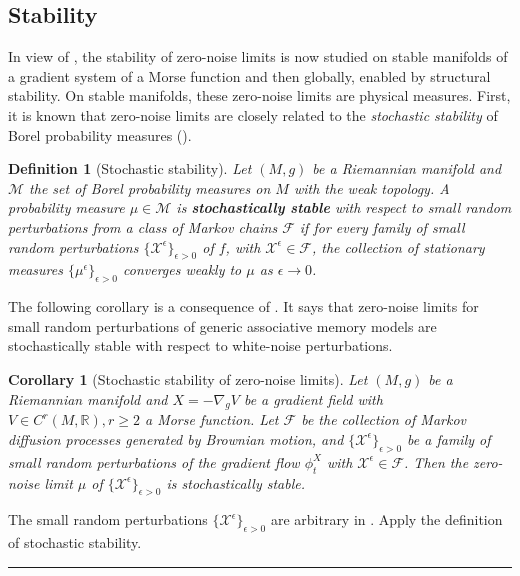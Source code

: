 \documentclass[12pt]{article}
\newcommand{\BlackBox}{\rule{1.5ex}{1.5ex}}  %
\renewenvironment{proof}{\par\noindent{\bf Proof\ }}{\hfill\BlackBox\\[2mm]}
\newenvironment{proof}{\par\noindent{\bf Proof\ }}{\hfill\BlackBox\\[2mm]}
\newtheorem{corollary}[theorem]{Corollary}
\newtheorem{definition}[theorem]{Definition}
\begin{document}
\subsection{Stability}
\label{subsection:robustness-diffusion-models}
In view of , the stability of zero-noise limits is now studied on stable manifolds of a gradient system of a Morse function and then globally, enabled by structural stability. On stable manifolds, these zero-noise limits are physical measures. First, it is known that zero-noise limits are closely related to the \textit{stochastic stability} of Borel probability measures (\cite{cowieson2005srb}). 

\begin{definition}[Stochastic stability]
\label{definition:stochastic-stability}
    Let $(M,g)$ be a Riemannian manifold and $\mathcal{M}$ the set of Borel probability measures on $M$ with the weak topology. A probability measure $\mu \in \mathcal{M}$ is \textbf{\textit{stochastically stable}} with respect to small random perturbations from a class of Markov chains $\mathcal{F}$ if for every family of small random perturbations $\{\mathcal{X}^{\epsilon}\}_{\epsilon>0}$ of $f$, with $\mathcal{X}^{\epsilon} \in \mathcal{F}$, the collection of stationary measures $\{\mu^{\epsilon}\}_{\epsilon>0}$ converges weakly to $\mu$ as $\epsilon \rightarrow 0$.
\end{definition}

The following corollary is a consequence of . It says that zero-noise limits for small random perturbations of generic associative memory models are stochastically stable with respect to white-noise perturbations.
\begin{corollary}[Stochastic stability of zero-noise limits]
\label{corollary:stochastically-stable}
    Let $(M,g)$ be a Riemannian manifold and $X=-\nabla_g V$ be a gradient field with $V \in C^r(M, \mathbb{R}), r\geq 2$ a Morse function. Let $\mathcal{F}$ be the collection of Markov diffusion processes generated by Brownian motion, and $\{\mathcal{X}^{\epsilon}\}_{\epsilon>0}$ be a family of small random perturbations of the gradient flow $\phi_t^X$ with $\mathcal{X}^{\epsilon}\in \mathcal{F}$. Then the zero-noise limit $\mu$ of $\{\mathcal{X}^{\epsilon}\}_{\epsilon>0}$ is stochastically stable.
\end{corollary}
\begin{proof}
    The small random perturbations $\{\mathcal{X}^{\epsilon}\}_{\epsilon>0}$ are arbitrary in . Apply the definition of stochastic stability.
\end{proof}
\end{document}
